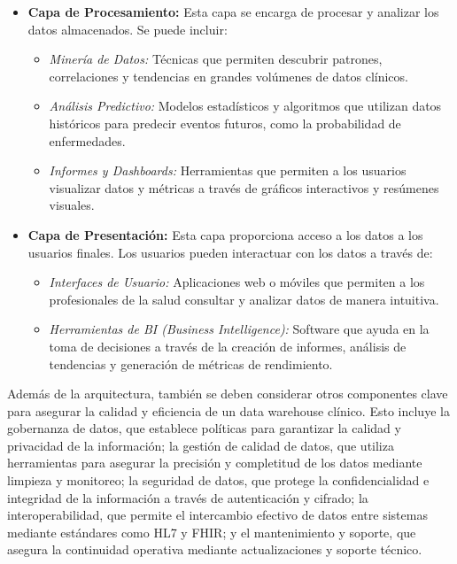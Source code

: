 \documentclass[12pt, a4paper, twoside]{article}
\begin{document}
\begin{itemize}
		\item \textbf{Capa de Procesamiento:} Esta capa se encarga de procesar y analizar los datos almacenados. Se puede incluir:
		\begin{itemize}
			\item \textit{Minería de Datos:} Técnicas que permiten descubrir patrones, correlaciones y tendencias en grandes volúmenes de datos clínicos.
			\item \textit{Análisis Predictivo:} Modelos estadísticos y algoritmos que utilizan datos históricos para predecir eventos futuros, como la probabilidad de enfermedades.
			\item \textit{Informes y Dashboards:} Herramientas que permiten a los usuarios visualizar datos y métricas a través de gráficos interactivos y resúmenes visuales.
		\end{itemize}
		
		\item \textbf{Capa de Presentación:} Esta capa proporciona acceso a los datos a los usuarios finales. Los usuarios pueden interactuar con los datos a través de:
		\begin{itemize}
			\item \textit{Interfaces de Usuario:} Aplicaciones web o móviles que permiten a los profesionales de la salud consultar y analizar datos de manera intuitiva.
			\item \textit{Herramientas de BI (Business Intelligence):} Software que ayuda en la toma de decisiones a través de la creación de informes, análisis de tendencias y generación de métricas de rendimiento.
		\end{itemize}
	\end{itemize}
	
	
	Además de la arquitectura, también se deben considerar otros componentes clave para asegurar la calidad y eficiencia de un data warehouse clínico. Esto incluye la gobernanza de datos, que establece políticas para garantizar la calidad y privacidad de la información; la gestión de calidad de datos, que utiliza herramientas para asegurar la precisión y completitud de los datos mediante limpieza y monitoreo; la seguridad de datos, que protege la confidencialidad e integridad de la información a través de autenticación y cifrado; la interoperabilidad, que permite el intercambio efectivo de datos entre sistemas mediante estándares como HL7 y FHIR; y el mantenimiento y soporte, que asegura la continuidad operativa mediante actualizaciones y soporte técnico.\cite{Portal2017}
	
\end{document}
